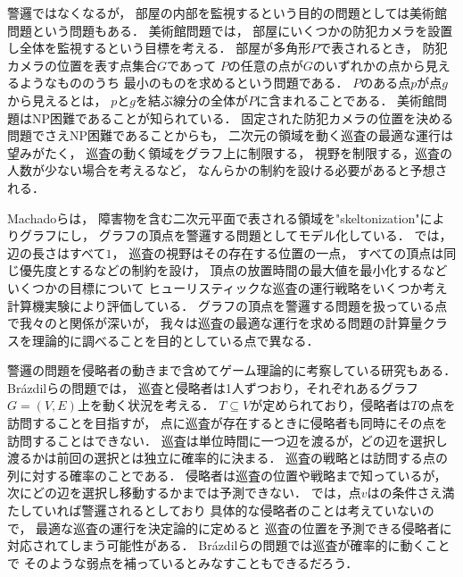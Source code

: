 警邏ではなくなるが，
部屋の内部を監視するという目的の問題としては美術館問題\cite{lee1986computational}という問題もある．
美術館問題では，
部屋にいくつかの防犯カメラを設置し全体を監視するという目標を考える．
部屋が多角形$P$で表されるとき，
防犯カメラの位置を表す点集合$G$であって
$P$の任意の点が$G$のいずれかの点から見えるようなもののうち
最小のものを求めるという問題である．
$P$のある点$p$が点$g$から見えるとは，
$p$と$g$を結ぶ線分の全体が$P$に含まれることである．
美術館問題はNP困難であることが知られている\cite{lee1986computational}．
%
固定された防犯カメラの位置を決める問題でさえNP困難であることからも，
二次元の領域を動く巡査の最適な運行は望みがたく，
巡査の動く領域をグラフ上に制限する，
視野を制限する，巡査の人数が少ない場合を考えるなど，
なんらかの制約を設ける必要があると予想される．

Machadoら\cite{machado2002multi}は，
障害物を含む二次元平面で表される領域を"skeltonization"によりグラフにし，
グラフの頂点を警邏する問題としてモデル化している．
\cite{machado2002multi}では，
辺の長さはすべて$1$，
巡査の視野はその存在する位置の一点，
すべての頂点は同じ優先度とするなどの制約を設け，
頂点の放置時間の最大値を最小化するなどいくつかの目標について
ヒューリスティックな巡査の運行戦略をいくつか考え計算機実験により評価している．
%
グラフの頂点を警邏する問題を扱っている点で我々の{\patProb}と関係が深いが，
我々は巡査の最適な運行を求める問題の計算量クラスを理論的に調べることを目的としている点で異なる．


警邏の問題を侵略者の動きまで含めてゲーム理論的に考察している研究もある\cite{
    alpern2017security,
    alpern2016patrolling,
    alpern2011patrolling,
    brazdil2015strategy,
    fomin2008annotated,
    garrec2016continuous,
    papadaki2016patrolling}．
Br{\'a}zdilら\cite{brazdil2015strategy}の問題では，
巡査と侵略者は1人ずつおり，それぞれあるグラフ$G = (V, E)$上を動く状況を考える．
$T \subseteq V$が定められており，侵略者は$T$の点を訪問することを目指すが，
点に巡査が存在するときに侵略者も同時にその点を訪問することはできない．
巡査は単位時間に一つ辺を渡るが，どの辺を選択し渡るかは前回の選択とは独立に確率的に決まる．
巡査の戦略とは訪問する点の列に対する確率のことである．
侵略者は巡査の位置や戦略まで知っているが，次にどの辺を選択し移動するかまでは予測できない．
%
{\patProb}では，点$v$は{\maxIdletime}の条件さえ満たしていれば警邏されるとしており
具体的な侵略者のことは考えていないので，
最適な巡査の運行を決定論的に定めると
巡査の位置を予測できる侵略者に対応されてしまう可能性がある．
Br{\'a}zdilら\cite{brazdil2015strategy}の問題では巡査が確率的に動くことで
そのような弱点を補っているとみなすこともできるだろう．

